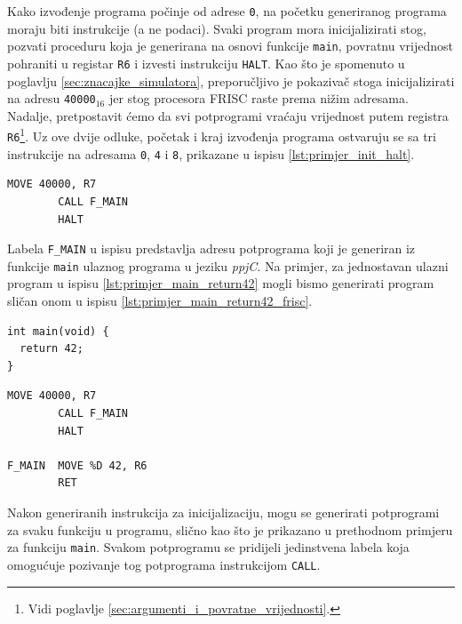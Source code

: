 \documentclass[times, 12pt, utf8]{book}
\begin{document}
Kako izvođenje programa počinje od adrese \verb|0|, na početku generiranog programa moraju biti instrukcije (a ne podaci).
Svaki program mora inicijalizirati stog, pozvati proceduru koja je generirana na osnovi funkcije \verb|main|, povratnu vrijednost pohraniti u registar \verb|R6| i izvesti instrukciju \verb|HALT|.
Kao što je spomenuto u poglavlju \ref{sec:znacajke_simulatora}, preporučljivo je pokazivač stoga inicijalizirati na adresu \verb|40000|\(_{16}\) jer stog procesora FRISC raste prema nižim adresama.
Nadalje, pretpostavit ćemo da svi potprogrami vraćaju vrijednost putem registra \verb|R6|\footnote{Vidi poglavlje \ref{sec:argumenti_i_povratne_vrijednosti}.}.
Uz ove dvije odluke, početak i kraj izvođenja programa ostvaruju se sa tri instrukcije na adresama \verb|0|, \verb|4| i \verb|8|, prikazane u ispisu \ref{lst:primjer_init_halt}.

\begin{lstlisting}[caption={Instrukcije za inicijalizaciju i završetak izvođenja programa.},label=lst:primjer_init_halt]
        MOVE 40000, R7
        CALL F_MAIN
        HALT
\end{lstlisting}

Labela \verb|F_MAIN| u ispisu predstavlja adresu potprograma koji je generiran iz funkcije \verb|main| ulaznog programa u jeziku \emph{ppjC}.
Na primjer, za jednostavan ulazni program u ispisu \ref{lst:primjer_main_return42} mogli bismo generirati program sličan onom u ispisu \ref{lst:primjer_main_return42_frisc}.

\begin{lstlisting}[caption={Jednostavan \emph{ppjC} program.},label=lst:primjer_main_return42]
int main(void) {
  return 42;
}
\end{lstlisting}

\begin{lstlisting}[caption={Mogući generirani FRISC mnemonički program za ispis \ref{lst:primjer_main_return42}.},label=lst:primjer_main_return42_frisc]
        MOVE 40000, R7
        CALL F_MAIN
        HALT
        
F_MAIN  MOVE %D 42, R6
        RET
\end{lstlisting}

Nakon generiranih instrukcija za inicijalizaciju, mogu se generirati potprogrami za svaku funkciju u programu, slično kao što je prikazano u prethodnom primjeru za funkciju \verb|main|.
Svakom potprogramu se pridijeli jedinstvena labela koja omogućuje pozivanje tog potprograma instrukcijom \verb|CALL|.
\end{document}
